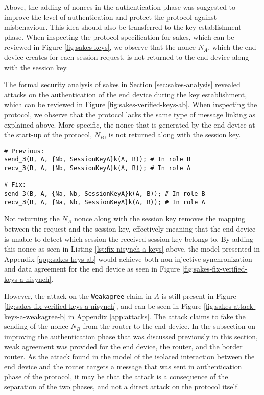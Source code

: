 Above, the adding of nonces in the authentication phase was suggested to improve the level of authentication and protect the protocol against misbehaviour. This idea should also be transferred to the key establishment phase. When inspecting the protocol specification for \gls{sakes}, which can be reviewed in Figure \ref{fig:sakes-keys}, we observe that the nonce $N_A$, which the end device creates for each session request, is not returned to the end device along with the session key.

The formal security analysis of \gls{sakes} in Section \ref{sec:sakes-analysis} revealed attacks on the authentication of the end device during the key establishment, which can be reviewed in Figure \ref{fig:sakes-verified-keys-ab}. When inspecting the protocol, we observe that the protocol lacks the same type of message linking as explained above. More specific, the nonce that is generated by the end device at the start-up of the protocol, $N_B$, is not returned along with the session key.


\begin{lstlisting}[caption={[Fix to the SAKES protocol to provide non-injective synchronization and data agreement for the end device during the key distribution.]Fix to the SAKES protocol to provide non-injective synchronization and data agreement for the end device $A$ during the key distribution. Changes to the protocol are highlighted in blue.}, label={lst:fix-nisynch-a-keys}, style=code-improvements-sakes-1]
# Previous:
send_3(B, A, {Nb, SessionKeyA}k(A, B)); # In role B
recv_3(B, A, {Nb, SessionKeyA}k(A, B)); # In role A
	
# Fix:
send_3(B, A, {Na, Nb, SessionKeyA}k(A, B)); # In role B
recv_3(B, A, {Na, Nb, SessionKeyA}k(A, B)); # In role A
\end{lstlisting}

Not returning the $N_A$ nonce along with the session key removes the mapping between the request and the session key, effectively meaning that the end device is unable to detect which session the received session key belongs to. By adding this nonce as seen in Listing \ref{lst:fix-nisynch-a-keys} above, the model presented in Appendix \ref{app:sakes-keys-ab} would achieve both non-injective synchronization and data agreement for the end device as seen in Figure \ref{fig:sakes-fix-verified-keys-a-nisynch}. 

However, the attack on the \texttt{Weakagree} claim in $A$ is still present in Figure \ref{fig:sakes-fix-verified-keys-a-nisynch}, and can be seen in Figure \ref{fig:sakes-attack-keys-a-weakagree-b} in Appendix \ref{app:attacks}. The attack claims to fake the sending of the nonce $N_B$ from the router to the end device. In the subsection on improving the authentication phase that was discussed previously in this section, weak agreement was provided for the end device, the router, and the border router. As the attack found in the model of the isolated interaction between the end device and the router targets a message that was sent in authentication phase of the protocol, it may be that the attack is a consequence of the separation of the two phases, and not a direct attack on the protocol itself.


